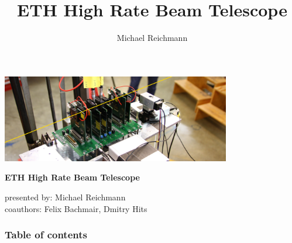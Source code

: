 \documentclass[9pt]{beamer}
\title[ETH High Rate Beam Telescope]{ETH High Rate Beam Telescope}
\author[M. Reichmann]{Michael Reichmann}
\institute[\textbf{\textit{ETH}}\scalebox{.6}{\textit{Z\"{u}rich}}]{Swiss Federal Institute of Technology Zurich}
\begin{document}
\begin{frame}
	\begin{center}
		\includegraphics[width=10cm]{Pics/telescope1}
	\end{center}
	\begin{alertblock}{
		\begin{center}
			\textbf{ETH High Rate Beam Telescope}
		\end{center}}
		\vspace*{10pt}
		\begin{center}\small
			presented by: Michael Reichmann \\ 
			coauthors: Felix Bachmair, Dmitry Hits
		\end{center}\normalsize
	\end{alertblock}
\end{frame}
\begin{frame}%
	\frametitle{Table of contents}
	\tableofcontents[hideallsubsections]   %
\end{frame}
\end{document}
